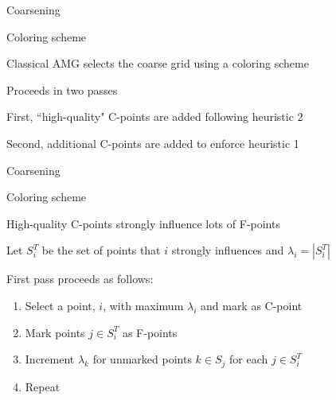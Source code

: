 \documentclass[18pt,xcolor=table]{beamer}
\begin{document}
\begin{frame}{Coarsening}
\begin{block}{Coloring scheme}
\bit
\item Classical AMG selects the coarse grid using a coloring scheme
\item Proceeds in two passes 
\item First, ``high-quality" C-points are added following heuristic 2
\item Second, additional C-points are added to enforce heuristic 1
\eit
\end{block}
\end{frame}

\begin{frame}{Coarsening}
\begin{block}{Coloring scheme}
\bit
\item High-quality C-points strongly influence lots of F-points
\item Let $S^T_i$ be the set of points that $i$ strongly influences and $\lambda_i = |S^T_i|$
\item First pass proceeds as follows:
\begin{enumerate}
\item Select a point, $i$, with maximum $\lambda_i$ and mark as C-point
\item Mark points $j\in S^T_i$ as F-points
\item Increment $\lambda_k$ for unmarked points $k\in S_j$ for each $j\in S^T_i$
\item Repeat
\end{enumerate}
\eit
\end{block}
\end{frame}
\end{document}
